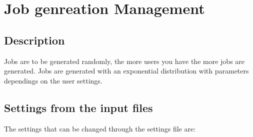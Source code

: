 \documentclass{scrreprt}
\begin{document}
\section{Job genreation Management}


\subsection{Description}
Jobs are to be generated randomly, the more users you have the more jobs are generated. Jobs are generated with an exponential distribution with parameters dependings on the user settings. 
\subsection{Settings from the input files}
The settings that can be changed through the settings file are:
\end{document}
